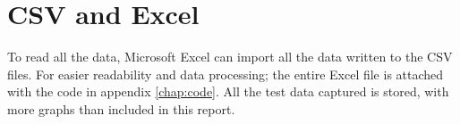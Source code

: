 \section{CSV and Excel}
To read all the data, Microsoft Excel can import all the data written to the CSV files. For easier readability and data processing; the entire Excel file is attached with the code in appendix \ref{chap:code}. All the test data captured is stored, with more graphs than included in this report.
